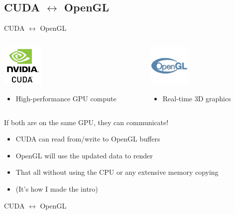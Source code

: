 \subsection{CUDA $\leftrightarrow$ OpenGL}\label{subsec:cuda-opengl}
\begin{frame}[t]{CUDA $\leftrightarrow$ OpenGL}
    \begin{columns}
        \begin{column}{0.5\textwidth}
            \centerline{\includegraphics[height=2cm]{./figures/cuda}}
            \begin{itemize}
                \item High-performance GPU compute
            \end{itemize}
        \end{column}
        \begin{column}{0.5\textwidth}
            \centerline{\includegraphics[height=2cm]{./figures/opengl}}
            \begin{itemize}
                \item Real-time 3D graphics
            \end{itemize}
        \end{column}
    \end{columns}
    \centerline{If both are on the same GPU, they can communicate!}
    \begin{itemize}
        \item CUDA can read from/write to OpenGL buffers
        \item OpenGL will use the updated data to render
        \item That all without using the CPU or any extensive memory copying
        \item (It's how I made the intro)
    \end{itemize}
\end{frame}

\begin{frame}{CUDA $\leftrightarrow$ OpenGL}
    \centerline{\resizebox{0.95\linewidth}{!}{}}
\end{frame}


